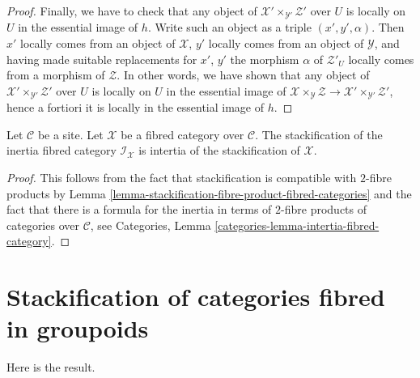 \begin{proof}
\medskip\noindent
Finally, we have to check that any object of
$\mathcal{X}' \times_{\mathcal{Y}'} \mathcal{Z}'$
over $U$ is locally on $U$ in the essential image of $h$.
Write such an object as a triple $(x', y', \alpha)$.
Then $x'$ locally comes from an object of $\mathcal{X}$,
$y'$ locally comes from an object of $\mathcal{Y}$, and
having made suitable replacements for $x'$, $y'$ the morphism
$\alpha$ of $\mathcal{Z}'_U$ locally comes from a morphism of
$\mathcal{Z}$. In other words, we have shown that any object of
$\mathcal{X}' \times_{\mathcal{Y}'} \mathcal{Z}'$
over $U$ is locally on $U$ in the essential image of
$\mathcal{X} \times_{\mathcal{Y}} \mathcal{Z} \to
\mathcal{X}' \times_{\mathcal{Y}'} \mathcal{Z}'$, hence
a fortiori it is locally in the essential image of $h$.
\end{proof}

\begin{lemma}
\label{lemma-stackification-inertia}
Let $\mathcal{C}$ be a site.
Let $\mathcal{X}$ be a fibred category over $\mathcal{C}$.
The stackification of the inertia fibred category $\mathcal{I}_\mathcal{X}$
is intertia of the stackification of $\mathcal{X}$.
\end{lemma}

\begin{proof}
This follows from the fact that stackification is compatible
with $2$-fibre products by
Lemma \ref{lemma-stackification-fibre-product-fibred-categories}
and the fact that there is a formula for the inertia in terms of
$2$-fibre products of categories over $\mathcal{C}$, see
Categories, Lemma \ref{categories-lemma-intertia-fibred-category}.
\end{proof}





\section{Stackification of categories fibred in groupoids}
\label{section-stackify-groupoids}

\noindent
Here is the result.


